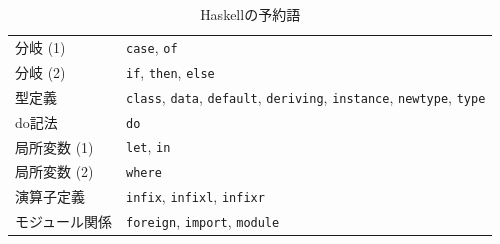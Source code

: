 \documentclass[a4paper,twocolumn]{jsbook}
\newcommand{\programminglanguage}[1]{\textsf{#1}}
\newcommand{\haskell}{\programminglanguage{Haskell}}
\newcommand{\code}[1]{\texttt{#1}}
\begin{document}
\begin{table}
\caption{\haskell の予約語}
\label{tab:reserved-keywords}
\begin{center}
\begin{tabular}{||l|l||}
\hline
分岐 (1)&\code{case}, \code{of}\\
分岐 (2)&\code{if}, \code{then}, \code{else}\\
型定義&\code{class}, \code{data}, \code{default}, \code{deriving}, \code{instance}, \code{newtype}, \code{type}\\
do記法&\code{do}\\
局所変数 (1)&\code{let}, \code{in}\\
局所変数 (2)&\code{where}\\
演算子定義&\code{infix}, \code{infixl}, \code{infixr}\\
モジュール関係&\code{foreign}, \code{import}, \code{module}\\
\hline
\end{tabular}
\end{center}
\end{table}

\end{document}
